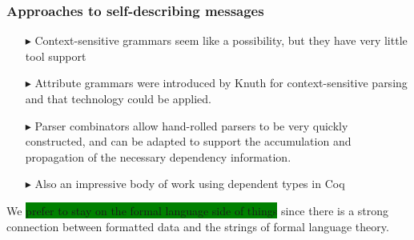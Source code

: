 \documentclass{beamer}
\newcommand{\gemph}[1]{\colorbox{green}{#1}}
\newcommand{\konst}[1]{\ensuremath{\mbox{\bf{#1}}}}
\begin{document}
\begin{frame}\frametitle{Approaches to self-describing messages}
\begin{itemize}

\item [$\blacktriangleright$] Context-sensitive grammars seem like a
  possibility, but they have very little tool support

\item [$\blacktriangleright$] Attribute grammars were introduced by
  Knuth for context-sensitive parsing and that technology could be
  applied.

\item [$\blacktriangleright$] Parser combinators allow hand-rolled
  parsers to be very quickly constructed, and can be adapted to
  support the accumulation and propagation of the necessary dependency
  information.

\item [$\blacktriangleright$] Also an impressive body of work using
  dependent types in Coq

\end{itemize}

We \gemph{prefer to stay on the formal language side of things} since there is
a strong connection between formatted data and the strings of formal
language theory.

\end{frame}








\end{document}
